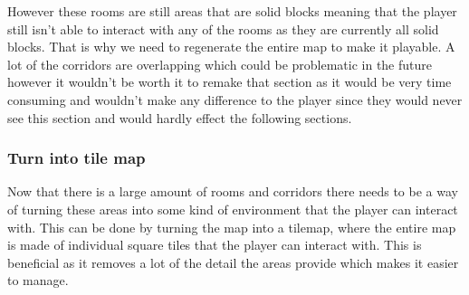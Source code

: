 \documentclass{article}
\begin{document}
However these rooms are still areas  that are solid blocks meaning that the player still isn't able to interact with any of the rooms as they are currently all solid blocks. That is why we need to regenerate the entire map to make it playable. A lot of the corridors are overlapping which could be problematic in the future however it wouldn't be worth it to remake that section as it would be very time consuming and wouldn't make any difference to the player since they would never see this section and would hardly effect the following sections.



\subsubsection{Turn into tile map}
Now that there is a large amount of rooms and corridors there needs to be a way of turning these areas into some kind of environment that the player can interact with. This can be done by turning the map into a tilemap, where the entire map is made of individual square tiles that the player can interact with. This is beneficial as it removes a lot of the detail the areas provide which makes it easier to manage. 
\end{document}
